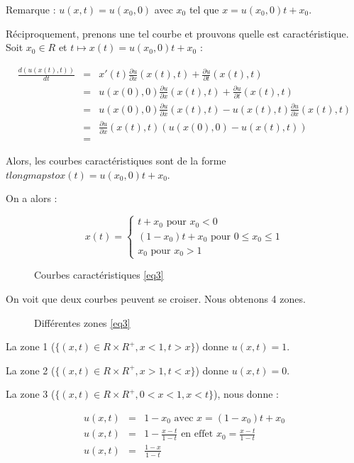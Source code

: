 \documentclass{article}
\begin{document}
Remarque : $u(x,t) = u(x_0,0)$ avec $x_0$ tel que $x = u(x_0,0) t + x_0$.
\newline

Réciproquement, prenons une tel courbe et prouvons quelle est caractéristique. Soit $x_0 \in R$ et $t \longmapsto x(t) = u(x_0,0) t + x_0$ :

\begin{eqnarray*}
	\frac{d (u(x(t),t))}{dt} &=& x'(t) \frac{\partial u}{\partial x}(x(t),t) + \frac{\partial u}{\partial t}(x(t),t) \\
	&=& u(x(0),0) \frac{\partial u}{\partial x}(x(t),t) + \frac{\partial u}{\partial t}(x(t),t) \\
	&=& u(x(0),0) \frac{\partial u}{\partial x}(x(t),t) - u(x(t),t) \frac{\partial u}{\partial x}(x(t),t) \\
	&=& \frac{\partial u}{\partial x}(x(t),t) \left( u(x(0),0)-u(x(t),t) \right) \\
	&=& 
\end{eqnarray*}

Alors, les courbes caractéristiques sont de la forme $t longmapsto x(t) = u(x_0,0) t + x_0$.

On a alors :

\[
x(t) = \left\{ \begin{matrix}
	t + x_0 \text{ pour } x_0 < 0 \\
	(1-x_0) t + x_0 \text{ pour } 0 \leq x_0 \leq 1 \\
	x_0 \text{ pour } x_0 > 1
\end{matrix} \right. \]

\begin{figure}
  
  \caption{Courbes caractéristiques \ref{eq3}}
\end{figure}

On voit que deux courbes peuvent se croiser. Nous obtenons 4 zones.

\begin{figure} 
  
  \caption{Différentes zones \ref{eq3}}
\end{figure}

La zone 1 ($\{(x,t) \in R \times R^{+}, x < 1, t > x\}$) donne $u(x,t) = 1$.

La zone 2 ($\{(x,t) \in R \times R^{+}, x > 1, t < x\}$) donne $u(x,t) = 0$.

La zone 3 ($\{(x,t) \in R \times R^{+}, 0 < x < 1, x < t \}$), nous donne :

\begin{eqnarray*}
	u(x,t) &=& 1 - x_0 \text{ avec } x = (1-x_0) t + x_0 \\
	u(x,t) &=& 1 - \frac{x-t}{1-t} \text{ en effet } x_0 = \frac{x-t}{1-t} \\
	u(x,t) &=& \frac{1-x}{1-t}  
\end{eqnarray*}
\end{document}
